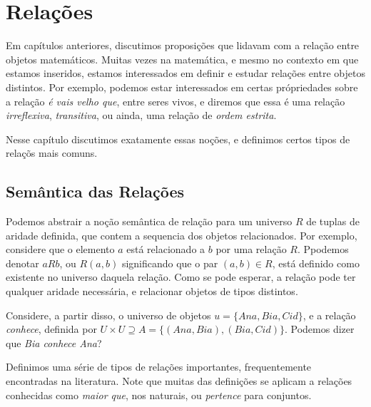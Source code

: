 \chapter{Relações}
Em capítulos anteriores, discutimos proposições que lidavam com a relação entre objetos matemáticos. Muitas vezes na matemática, e mesmo no contexto em que estamos inseridos, estamos interessados em definir e estudar relações entre objetos distintos. Por exemplo, podemos estar interessados em certas própriedades sobre a relação \textit{é vais velho que}, entre seres vivos, e diremos que essa é uma relação \textit{irreflexiva}, \textit{transitiva}, ou ainda, uma relação de \textit{ordem estrita}.

Nesse capítulo discutimos exatamente essas noções, e definimos certos tipos de relaçõs mais comuns.

\section{Semântica das Relações}
Podemos abstrair a noção semântica de relação para um universo $R$ de tuplas de aridade definida, que contem a sequencia dos objetos relacionados. Por exemplo, considere que o elemento $a$ está relacionado a $b$ por uma relação $R$. Ppodemos denotar $aRb$, ou $R(a,b)$ significando que o par $(a,b)\in R$, está definido como existente no universo daquela relação. Como se pode esperar, a relação pode ter qualquer aridade necessária, e relacionar objetos de tipos distintos.

Considere, a partir disso, o universo de objetos $u = \{Ana, Bia, Cid\}$, e a relação \textit{conhece}, definida por $U\times U \supseteq A = \{(Ana, Bia), (Bia, Cid)\}$. Podemos dizer que \textit{Bia conhece Ana}?

\theoremstyle{definition}
\newtheorem{definition}{Definição}[section]


\theoremstyle{plain}
\newtheorem{theorem}{Proposição}[section]


Definimos uma série de tipos de relações importantes, frequentemente encontradas na literatura.
Note que muitas das definições se aplicam a relações conhecidas como \textit{maior que}, nos naturais, ou \textit{pertence} para conjuntos.

